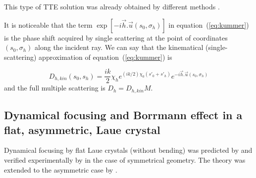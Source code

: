 \documentclass[preprint]{iucr}              %
\newcommand{\inred}[1]{{\color{red}#1}}
\begin{document}
This \inred{type of TTE solution} was already obtained by different methods \cite{Petrashen1974,Katagawa1974,Litzmann1974,Chukhovski1977}.

\inred{
It is noticeable that the term $\exp[-i\vec h . \vec u (s_0,\sigma_h)]$ in equation~(\ref{eq:kummer}) is the phase shift acquired by single scattering at the point of coordinates $(s_0,\sigma_h)$ along the incident ray. We can say that the kinematical (single-scattering) approximation of equation~(\ref{eq:kummer}) is 

\begin{equation}
\label{eq:kummerapprox}
    D_{h,kin}(s_0,s_h) = \frac{i k }{2} \chi_h e^{(ik/2) \chi_0 (s'_0 + s'_h)} e^{-i \vec h . \vec u (s_0,\sigma_h)} 
\end{equation}
and the full multiple scattering is $D_h=D_{h,kin} M$.
}

          
\subsection{Dynamical focusing and Borrmann effect in a flat\inred{, asymmetric, Laue} crystal}
\label{sec:LaueFlat}



Dynamical focusing \inred{by} flat Laue crystals (without bending) \inred{was predicted by}  and verified experimentally by 
in the case of symmetrical geometry. The theory was extended to the asymmetric case by .
\end{document}
